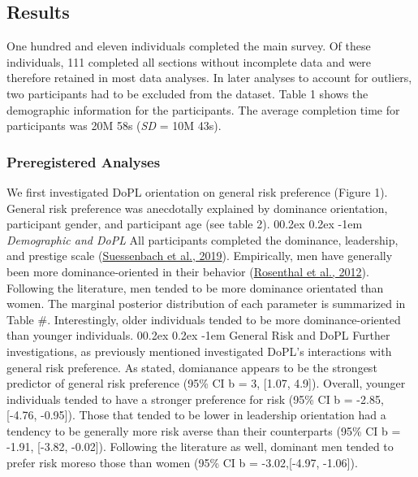 \documentclass[
  donotrepeattitle,doc, 12pt, a4paper,floatsintext]{apa7}
\makeatletter
\let\oldparagraph\paragraph
\renewcommand{\paragraph}[1]{\oldparagraph{#1}\mbox{}}
\renewcommand{\paragraph}{\@startsection{paragraph}{4}{\parindent}%
  {0\baselineskip \@plus 0.2ex \@minus 0.2ex}%
  {-1em}%
  {\normalfont\normalsize\bfseries\itshape\typesectitle}}
\makeatother
\begin{document}
\hypertarget{results}{%
\subsection{Results}\label{results}}
One hundred and eleven individuals completed the main survey. Of these individuals, 111 completed all sections without incomplete data and were therefore retained in most data analyses. In later analyses to account for outliers, two participants had to be excluded from the dataset. Table 1 shows the demographic information for the participants. The average completion time for participants was 20M 58s (\emph{SD} = 10M 43s).
\hypertarget{preregistered-analyses}{%
\subsubsection{Preregistered Analyses}\label{preregistered-analyses}}
We first investigated DoPL orientation on general risk preference (Figure 1). General risk preference was anecdotally explained by dominance orientation, participant gender, and participant age (see table 2).
\hypertarget{demographic-and-dopl}{%
\paragraph{\texorpdfstring{\emph{Demographic and DoPL}}{Demographic and DoPL}}\label{demographic-and-dopl}}
All participants completed the dominance, leadership, and prestige scale (\protect\hyperlink{ref-suessenbach2019}{Suessenbach et al., 2019}). Empirically, men have generally been more dominance-oriented in their behavior (\protect\hyperlink{ref-rosenthal2012}{Rosenthal et al., 2012}). Following the literature, men tended to be more dominance orientated than women. The marginal posterior distribution of each parameter is summarized in Table \#. Interestingly, older individuals tended to be more dominance-oriented than younger individuals.
\hypertarget{general-risk-and-dopl}{%
\paragraph{General Risk and DoPL}\label{general-risk-and-dopl}}
Further investigations, as previously mentioned investigated DoPL's interactions with general risk preference. As stated, domianance appears to be the strongest predictor of general risk preference (95\% CI b = 3, {[}1.07, 4.9{]}). Overall, younger individuals tended to have a stronger preference for risk (95\% CI b = -2.85, {[}-4.76, -0.95{]}). Those that tended to be lower in leadership orientation had a tendency to be generally more risk averse than their counterparts (95\% CI b = -1.91, {[}-3.82, -0.02{]}). Following the literature as well, dominant men tended to prefer risk moreso those than women (95\% CI b = -3.02,{[}-4.97, -1.06{]}).
\end{document}
